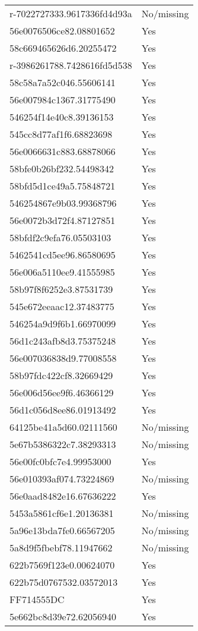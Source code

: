 \begin{tabular}{ll}
r-7022727333.9617336fd4d93a & No/missing \\
56e0076506ce82.08801652 & Yes \\
58c669465626d6.20255472 & Yes \\
r-3986261788.7428616fd5d538 & Yes \\
58c58a7a52c046.55606141 & Yes \\
56e007984c1367.31775490 & Yes \\
546254f14e40c8.39136153 & Yes \\
545cc8d77af1f6.68823698 & Yes \\
56e0066631c883.68878066 & Yes \\
58bfe0b26bf232.54498342 & Yes \\
58bfd5d1ce49a5.75848721 & Yes \\
546254867e9b03.99368796 & Yes \\
56e0072b3d72f4.87127851 & Yes \\
58bfdf2c9efa76.05503103 & Yes \\
5462541cd5ee96.86580695 & Yes \\
56e006a5110ee9.41555985 & Yes \\
58b97f8f6252e3.87531739 & Yes \\
545e672eeaac12.37483775 & Yes \\
546254a9d9f6b1.66970099 & Yes \\
56d1c243afb8d3.75375248 & Yes \\
56e007036838d9.77008558 & Yes \\
58b97fdc422cf8.32669429 & Yes \\
56e006d56ee9f6.46366129 & Yes \\
56d1c056d8ee86.01913492 & Yes \\
64125be41a5d60.02111560 & No/missing \\
5e67b5386322c7.38293313 & No/missing \\
56e00fc0bfc7e4.99953000 & Yes \\
56e010393af074.73224869 & No/missing \\
56e0aad8482e16.67636222 & Yes \\
5453a5861cf6e1.20136381 & No/missing \\
5a96e13bda7fe0.66567205 & No/missing \\
5a8d9f5fbebf78.11947662 & No/missing \\
622b7569f123e0.00624070 & Yes \\
622b75d0767532.03572013 & Yes \\
FF714555DC & Yes \\
5e662bc8d39e72.62056940 & Yes \\

\end{tabular}
